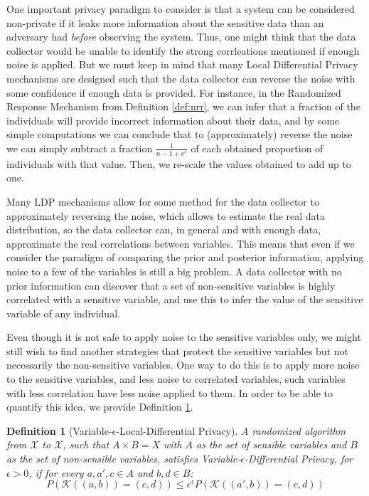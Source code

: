 \documentclass[conference]{IEEEtran}
\newtheorem{definition}{Definition}
\begin{document}
One important privacy paradigm to consider is that a system can be considered non-private if it leaks more information about the sensitive data than an adversary had \emph{before} observing the system. Thus, one might think that the data collector would be unable to identify the strong corrleations mentioned if enough noise is applied. But we must keep in mind that many Local Differential Privacy mechanisms are designed such that the data collector can reverse the noise with some confidence if enough data is provided. For instance, in the Randomized Response Mechanism from Definition \ref{def:nrr}, we can infer that a fraction of the individuals will provide incorrect information about their data, and by some simple computations we can conclude that to (approximately) reverse the noise we can simply subtract a fraction $\frac{1}{n-1+e^\epsilon}$ of each obtained proportion of individuals with that value. Then, we re-scale the values obtained to add up to one.

Many LDP mechanisms allow for some method for the data collector to approximately reversing the noise, which allows to estimate the real data distribution, so the data collector can, in general and with enough data, approximate the real correlations between variables. This means that even if we consider the paradigm of comparing the prior and posterior information, applying noise to a few of the variables is still a big problem. A data collector with no prior information can discover that a set of non-sensitive variables is highly correlated with a sensitive variable, and use this to infer the value of the sensitive variable of any individual.

Even though it is not safe to apply noise to the sensitive variables only, we might still wish to find another strategies that protect the sensitive variables but not necessarily the non-sensitive variables. One way to do this is to apply more noise to the sensitive variables, and less noise to correlated variables, such variables with less correlation have less noise applied to them. In order to be able to quantify this idea, we provide Definition \ref{def:veldp}.


\begin{definition}[Variable-$\epsilon$-Local-Differential Privacy]\label{def:veldp} A randomized algorithm from $\mathcal{X}$ to $\mathcal{X}$, such that $A\times B = X$ with $A$ as the set of sensible variables and $B$ as the set of non-sensible variables, satisfies Variable-$\epsilon$-Differential Privacy, for $\epsilon > 0$, if for every $a, a', c \in A$ and $b, d \in B$:
$$P(\mathcal{K}((a,b)) = (c,d)) \leq e^\epsilon P(\mathcal{K}((a',b)) = (c,d))$$
\end{definition}
\end{document}
